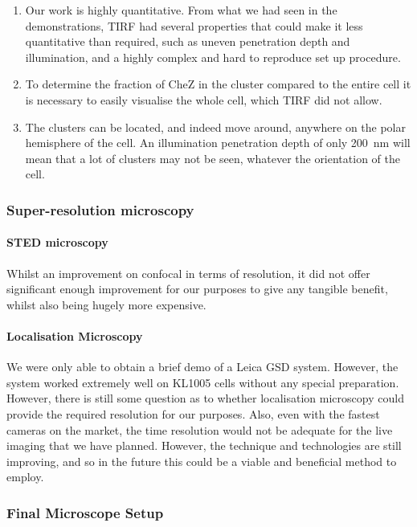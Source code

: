 \documentclass[../main.tex]{subfiles}
\begin{document}
\begin{enumerate}
	\item Our work is highly quantitative. From what we had seen in the demonstrations, TIRF had several properties that could make it less quantitative than required, such as uneven penetration depth and illumination, and a highly complex and hard to reproduce set up procedure.
	\item To determine the fraction of CheZ in the cluster compared to the entire cell it is necessary to easily visualise the whole cell, which TIRF did not allow.
	\item The clusters can be located, and indeed move around, anywhere on the polar hemisphere of the cell. An illumination penetration depth of only \SI{200}{\nano\meter} will mean that a lot of clusters may not be seen, whatever the orientation of the cell. 
\end{enumerate}

\subsubsection{Super-resolution microscopy}

\paragraph{STED microscopy} Whilst an improvement on confocal in terms of resolution, it did not offer significant enough improvement for our purposes to give any tangible benefit, whilst also being hugely more expensive.

\paragraph{Localisation Microscopy} We were only able to obtain a brief demo of a Leica GSD system. However, the system worked extremely well on KL1005 cells without any special preparation. However, there is still some question as to whether localisation microscopy could provide the required resolution for our purposes. Also, even with the fastest cameras on the market, the time resolution would not be adequate for the live imaging that we have planned. However, the technique and technologies are still improving, and so in the future this could be a viable and beneficial method to employ.

\subsubsection{Final Microscope Setup}
\end{document}
